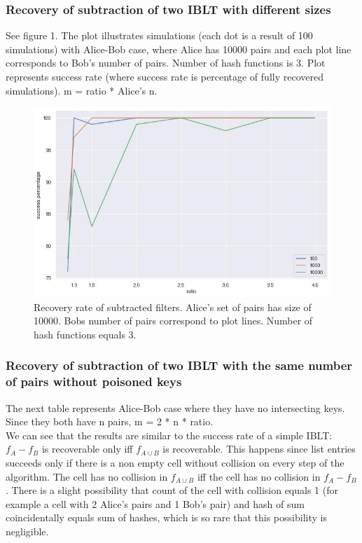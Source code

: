 \documentclass{article}
\begin{document}
\subsubsection{Recovery of subtraction of two IBLT with different sizes}

See figure 1. The plot illustrates simulations (each dot is a result of 100 
simulations) with Alice-Bob case, where Alice has 10000 pairs and each plot 
line corresponds to Bob's number of pairs. Number of hash functions is 3.
Plot represents success rate (where success rate is percentage of fully 
recovered simulations). m = ratio * Alice's n.

\begin{figure}[h]
\centering
\includegraphics[scale=1.3]{./different_sizes.jpg}
\caption{Recovery rate of subtracted filters. Alice's set of pairs has size of 
10000. Bobs number of pairs correspond to plot lines. Number of hash functions equals 3.}  

\end{figure}


\subsubsection{Recovery of subtraction of two IBLT with the same number of pairs without poisoned keys}

The next table represents Alice-Bob case where they have no intersecting keys. 
Since they both have n pairs, m = 2 * n * ratio.
\\
We can see that the results are similar to the success rate of a simple IBLT:
$f_A - f_B$ is recoverable only iff $f_{A \cup B}$ is recoverable. This happens 
since list entries succeeds only if there is a non empty cell without collision 
on every step of the algorithm. The cell has no collision in $f_{A \cup B}$ iff
the cell has no collision in $f_{A} - f_{B}$. There is a slight possibility that 
count of the cell with collision equals 1 (for example a cell with 2 Alice's pairs
and 1 Bob's pair) and hash of sum coincidentally equals sum of hashes, which is 
so rare that this possibility is negligible. 
\end{document}
